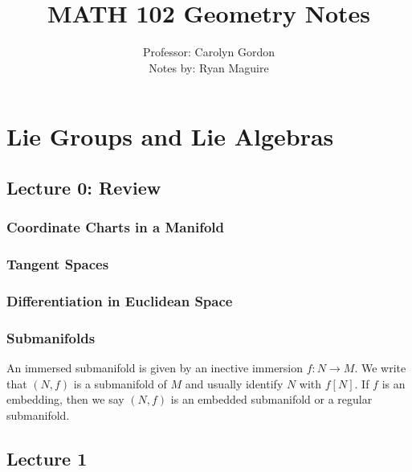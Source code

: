 \documentclass[oneside]{book}                                                  %
\begin{document}
    \title{MATH 102 Geometry Notes}
    \author{%
        Professor: Carolyn Gordon\\
        Notes by: Ryan Maguire%
    }
    \date{\vspace{-5ex}}
    \maketitle
    \tableofcontents
    \chapter{Lie Groups and Lie Algebras}
        \section{Lecture 0: Review}
            \subsection{Coordinate Charts in a Manifold}
            \subsection{Tangent Spaces}
            \subsection{Differentiation in Euclidean Space}
            \subsection{Submanifolds}
                An immersed submanifold is given by an inective immersion
                $f:N\rightarrow{M}$. We write that $(N,f)$ is a submanifold of
                $M$ and usually identify $N$ with $f[N]$. If $f$ is an
                embedding, then we say $(N,f)$ is an embedded submanifold or a
                regular submanifold.
        \section{Lecture 1}
\end{document}
